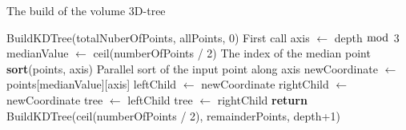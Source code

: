 \begin{algorithm}
\caption{The build of the volume 3D-tree}
\label{volume_kdtree_build}
\begin{algorithmic}
\State BuildKDTree(totalNuberOfPoints, allPoints, 0) \Comment First call
  \State axis $\gets$ depth $\bmod$ 3
  \State medianValue $\gets$ ceil(numberOfPoints / 2) \Comment The index of the median point
  \State \textbf{sort}(points, axis) \Comment Parallel sort of the input point along axis
  \State newCoordinate $\gets$ points[medianValue][axis]
  \State leftChild $\gets$ newCoordinate
  \State rightChild $\gets$ newCoordinate
  \State tree $\gets$ leftChild
  \State tree $\gets$ rightChild
  \State \textbf{return} BuildKDTree(ceil(numberOfPoints / 2), remainderPoints, depth+1)
  \EndIf
\EndProcedure
\end{algorithmic}
\end{algorithm}


